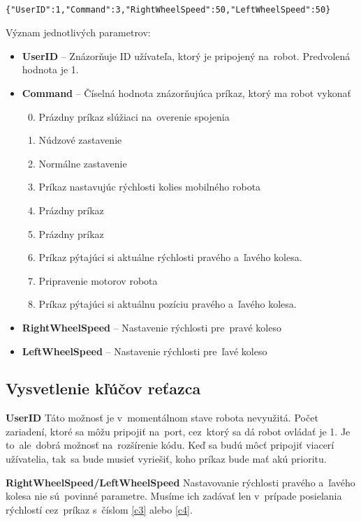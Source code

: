 	\label{jsonSpeedRequestBad}
	\begin{lstlisting}
			{"UserID":1,"Command":3,"RightWheelSpeed":50,"LeftWheelSpeed":50}
	\end{lstlisting}

	\newpage

	\noindent Význam jednotlivých parametrov:
	\begin{itemize}
		\item \textbf{UserID} -- Znázorňuje ID užívateľa, ktorý je pripojený na~robot. Predvolená hodnota je 1.
		\item \textbf{Command} --  Číselná hodnota znázorňujúca príkaz, ktorý ma robot vykonať
			\begin{enumerate}
				\setcounter{enumi}{-1}
				\item \label{c0} Prázdny príkaz slúžiaci na~overenie spojenia
				\item \label{c1} Núdzové zastavenie
				\item \label{c2} Normálne zastavenie
				\item \label{c3} Príkaz nastavujúc rýchlosti kolies mobilného robota
				\item \label{c4} Prázdny príkaz
				\item \label{c5} Prázdny príkaz
				\item \label{c6} Príkaz pýtajúci si aktuálne rýchlosti pravého a~ľavého kolesa.
				\item \label{c7} Pripravenie motorov robota
				\item \label{c8} Príkaz pýtajúci si aktuálnu pozíciu pravého a~ľavého kolesa.
			\end{enumerate}
		\item \textbf{RightWheelSpeed} -- Nastavenie rýchlosti pre~pravé koleso
		\item \textbf{LeftWheelSpeed} -- Nastavenie rýchlosti pre~ľavé koleso
	\end{itemize}

\subsection{Vysvetlenie kľúčov reťazca}

\noindent \textbf{UserID} \newline
\indent Táto možnosť je v~momentálnom stave robota nevyužitá. Počet zariadení, ktoré sa môžu pripojiť na~port, cez~ktorý sa dá robot ovládať
je 1. Je to~ale~dobrá možnosť na~rozšírenie kódu. Keď sa budú môcť pripojiť viacerí užívatelia, tak~sa bude musieť vyriešiť, koho príkaz
bude mať akú prioritu. \newline

\noindent \textbf{RightWheelSpeed/LeftWheelSpeed} \newline
\indent Nastavovanie rýchlosti pravého a~ľavého kolesa nie sú~povinné parametre. Musíme ich zadávať len v~prípade posielania rýchlostí
cez~príkaz s~číslom \ref{c3} alebo \ref{c4}.
